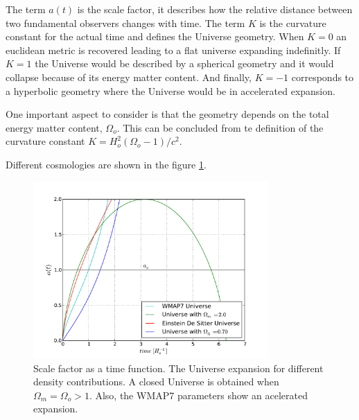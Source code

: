 The term $a(t)$ is the scale factor, it describes how the relative
distance between two fundamental observers changes with time. 
The term $K$ is the curvature constant for the actual time and defines
the Universe geometry. When $K=0$ an euclidean metric is recovered 
leading to a flat universe expanding indefinitly. If $K=1$ the Universe
would be described by a spherical geometry and it would collapse because
of its energy matter content. And finally, $K=-1$ corresponds to a
hyperbolic geometry where the Universe would be in accelerated expansion.  

One important aspect to consider is that the geometry depends on the 
total energy matter content, $\Omega_o$. This can be concluded from
te definition of the curvature constant $K = H_o^2(\Omega_o -1)/c^2$. 

Different cosmologies are shown in the figure \ref{factor}. 

\begin{figure}[htbp]
       \centering
               \includegraphics[width=0.8\textwidth]{Images/chapter2/factordeescala.pdf}
       \caption{ \small Scale factor as a time function. The Universe expansion for 
       different density contributions. A closed Universe is obtained when 
       $\Omega_m = \Omega_o>1$. Also, the WMAP7 parameters show an acelerated expansion. 
        }
       \label{factor}
 \end{figure}

